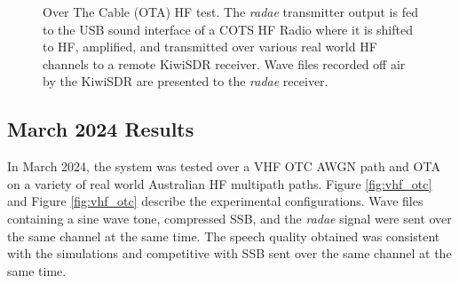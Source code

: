 \documentclass{article}
\begin{document}
\begin{figure}[H]
\caption{Over The Cable (OTA) HF test. The \emph{radae} transmitter output is fed to the USB sound interface of a COTS HF Radio where it is shifted to HF, amplified, and transmitted over various real world HF channels to a remote KiwiSDR receiver.  Wave files recorded off air by the KiwiSDR are presented to the \emph{radae} receiver.}
\label{fig:hf_ota}
\begin{center}
\end{center}
\end{figure}

\subsection{March 2024 Results}

In March 2024, the system was tested over a VHF OTC AWGN path and OTA on a variety of real world Australian HF multipath paths. Figure \ref{fig:vhf_otc} and Figure \ref{fig:vhf_otc} describe the experimental configurations.  Wave files containing a sine wave tone, compressed SSB, and the \emph{radae} signal were sent over the same channel at the same time. The speech quality obtained was consistent with the simulations and competitive with SSB sent over the same channel at the same time.
\end{document}
